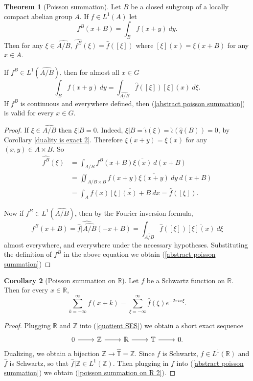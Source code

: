 \documentclass[12pt]{book}
\newcommand{\ZZ}{\mathbb{Z}}
\newcommand{\RR}{\mathbb{R}}
\newcommand{\Torus}{\mathbb{T}}
\theoremstyle{definition}
\newtheorem{theorem}{Theorem}[section]
\newtheorem{corollary}[theorem]{Corollary}
\begin{document}
\begin{theorem}[Poisson summation]
Let $B$ be a closed subgroup of a locally compact abelian group $A$.
If $f \in L^1(A)$ let
$$f^B(x + B) = \int_B f(x + y)~dy.$$
Then for any $\xi \in \widehat{A/B}$, $\widehat{f^B}(\xi) = \hat f([\xi])$
where $[\xi](x) = \xi(x + B)$ for any $x \in A$.

If $f^B \in L^1(\widehat{A/B})$, then for almost all $x \in G$
\begin{equation}
\label{abstract poisson summation}
\int_B f(x + y)~dy = \int_{\widehat{A/B}} \hat f([\xi]) [\xi](x) ~d\xi.
\end{equation}
If $f^B$ is continuous and everywhere defined, then (\ref{abstract poisson summation}) is valid for every $x \in G$.
\end{theorem}
\begin{proof}
If $\xi \in \widehat{A/B}$ then $\xi|B = 0$. Indeed, $\xi|B = \hat \iota(\xi) = \hat \iota(\hat q(B)) = 0$, by Corollary \ref{duality is exact 2}.
Therefore $\xi(x + y) = \xi(x)$ for any $(x, y) \in A \times B$.
So
\begin{align*}\widehat{f^B}(\xi) &= \int_{A/B} f^B(x + B) \overline{\xi(x)}~d(x + B)\\& = \iint_{A/B \times B} f(x + y) \overline{\xi(x + y)}~dy~d(x+B) \\&= \int_A f(x)\overline{[\xi](x) + B}~dx = \hat f([\xi]).\end{align*}

Now if $f^B \in L^1(\widehat{A/B})$, then by the Fourier inversion formula,
$$f^B(x + B) = \widehat{\hat f|\widehat{A/B}}(-x + B) = \int_{\widehat{A/B}} \hat f([\xi]) \overline{[\xi](x)}~d\xi$$
almost everywhere, and everywhere under the necessary hypotheses.
Substituting the definition of $f^B$ in the above equation we obtain (\ref{abstract poisson summation})
\end{proof}

\begin{corollary}[Poisson summation on $\RR$]
\label{poisson summation on R}
Let $f$ be a Schwartz function on $\RR$. Then for every $x \in \RR$,
\begin{equation}
\label{poisson summation on R 2}
\sum_{k=-\infty}^\infty f(x + k) = \sum_{\xi = -\infty}^\infty \hat f(\xi) e^{-2\pi ix\xi}.
\end{equation}
\end{corollary}
\begin{proof}
Plugging $\RR$ and $\ZZ$ into (\ref{quotient SES}) we obtain a short exact sequence
$$\begin{tikzcd}
0 \arrow[r] & \ZZ \arrow[r] & \RR \arrow[r] & \Torus \arrow[r] & 0.
\end{tikzcd}$$
Dualizing, we obtain a bijection $\ZZ \to \widehat{\Torus} = \ZZ$.
Since $f$ is Schwartz, $f \in L^1(\RR)$ and $\hat f$ is Schwartz, so that $\hat f|\ZZ \in L^1(\ZZ)$.
Then plugging in $f$ into (\ref{abstract poisson summation}) we obtain (\ref{poisson summation on R 2}).
\end{proof}
\end{document}
